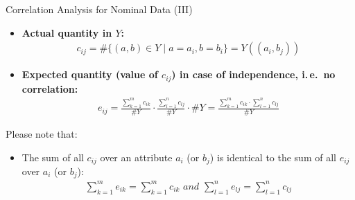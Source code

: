 \begin{frame}{Correlation Analysis for Nominal Data (III)}
	\begin{itemize}
		\item \textbf{Actual quantity in $Y$:}
		      \begin{align*}
			      c_{ij} = \#\{(a,b) \in Y \; \vert \; a = a_i, b= b_i\}
			      = Y((a_i, b_j))
		      \end{align*}
		\item \textbf{Expected quantity (value of $c_{ij}$) in case of
			      independence, i.\,e.\ no correlation:}
		      \begin{align*}
			      e_{ij} = \frac{\sum_{k=1}^{m} c_{ik}}{\#Y} \cdot
			      \frac{\sum_{l=1}^{n}c_{lj}}{\#Y} \cdot \#Y
			      = \frac{\sum_{k=1}^{m} c_{ik} \cdot \sum_{l=1}^{n}c_{lj}}{\#Y}
		      \end{align*}
	\end{itemize}

	\begin{block}{Please note that:}
		\begin{itemize}
			\item The sum of all $c_{ij}$ over an attribute $a_i$ (or $b_j$) is
			      identical to the sum of all $e_{ij}$ over $a_i$ (or $b_j$):
			      \vspace{-2mm}
			      \begin{align*}
				      \sum_{k=1}^{m} e_{ik} = \sum_{k=1}^{m} c_{ik}
				      \textit{ and }
				      \sum_{l=1}^{n} e_{lj} = \sum_{l=1}^{n} c_{lj}
			      \end{align*}
		\end{itemize}
	\end{block}
\end{frame}


